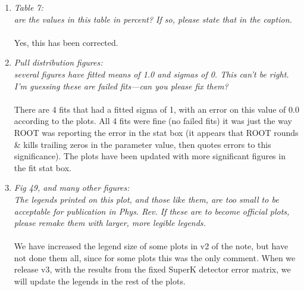 \begin{enumerate}
  The value $7.58 \times 10^{-5}$ is shown on p193,
  which is in the review of neutrino mixing, and is the result of a
  3-flavour fit, incorporating neutrino oscillation data (but not Daya Bay \& RENO).
  
  The value $7.50 \times 10^{-5}$ is shown on p642,
  which is the particle listings, and is the result of a 3-flavour fit
  on KAMLAND + solar data.

  \vspace{5 mm}
\item
  {\em
    Table 7:\\
    are the values in this table in percent?  If so, please state that in the caption.
  }\\
  \\
  Yes, this has been corrected.

  \vspace{5 mm}
\item
  {\em
    Pull distribution figures:\\
    several figures have fitted means of 1.0 and sigmas of 0.  This can't be right.  I'm guessing these are failed fits---can you please fix them?
  }\\
  \\
  There are 4 fits that had a fitted sigma of 1, with an error on this value of 0.0 according to the plots.
  All 4 fits were fine (no failed fits) it was just the way ROOT was reporting the error in the stat box
  (it appears that ROOT rounds \& kills trailing zeros in the parameter value, then quotes errors to this significance).
  The plots have been updated with more significant figures in the fit stat box.
  
  \vspace{5 mm}
\item
  {\em
    Fig 49, and many other figures:\\
    The legends printed on this plot, and those like them, are too small to be acceptable for publication in Phys. Rev.
    If these are to become official plots, please remake them with larger, more legible legends.
  }\\
  \\
  We have increased the legend size of some plots in v2 of the note,
  but have not done them all, since for some plots this was the only comment.
  When we release v3, with the results from the fixed SuperK detector error matrix,
  we will update the legends in the rest of the plots.
  

\end{enumerate}
